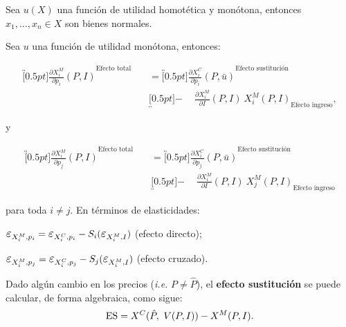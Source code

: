 \documentclass[8pt,a4paper]{extarticle}
\begin{document}
\begin{multicols}{3}
\begin{boxprop}
	Sea $u(X)$ una función de utilidad homotética y monótona, entonces $x_1, \ldots, x_n \in X$ son bienes normales.
\end{boxprop}

\begin{boxtheo}
	Sea $u$ una función de utilidad monótona, entonces:
	
	\begin{equation*}
	\begin{aligned}
		\overbracket[0.5pt]{\frac{\partial X^M_i}{\partial p_i} (P, I)}^{\text{Efecto total}} \quad &= \overbracket[0.5pt]{\frac{\partial X^C_i}{\partial p_i} (P, \bar{u})}^{\text{Efecto sustitución}} \\
		& \underbracket[0.5pt]{ - \quad\ \frac{\partial X_i^M}{\partial I} (P, I)\ X^M_i (P,I)}_{\text{Efecto ingreso}},
	\end{aligned}
	\end{equation*}
	
	y
	
	\begin{equation*}
	\begin{aligned}
		\overbracket[0.5pt]{\frac{\partial X^M_i}{\partial p_j} (P, I)}^{\text{Efecto total}} \quad &= \overbracket[0.5pt]{\frac{\partial X^C_i}{\partial p_j} (P, \bar{u})}^{\text{Efecto sustitución}} \\
		& \underbracket[0.5pt]{ - \quad\ \frac{\partial X_i^M}{\partial I} (P, I)\ X^M_j (P,I)}_{\text{Efecto ingreso}}
	\end{aligned}
	\end{equation*} 

	para toda $i \neq j$. En términos de elasticidades:

	\begin{eqlist}
	\item $\E_{X_i^M, p_i} = \E_{X_i^C, p_i} - S_i ( \E_{X_i^M, I})$ (efecto directo);
	\item $\E_{X_i^M, p_j} = \E_{X_i^C, p_j} - S_j ( \E_{X_i^M, I})$ (efecto cruzado).
	\end{eqlist}

\end{boxtheo}

\begin{boxdef}
	Dado algún cambio en los precios (\emph{i.e.} $P \neq \hat{P}$), el \textbf{efecto sustitución} se puede calcular, de forma algebraica, como sigue:
	\[
	\text{\normalfont ES} = X^C (\hat{P},\ V(P, I)) - X^M(P, I)
	.\] 
\end{boxdef}


\end{multicols}
\end{document}
